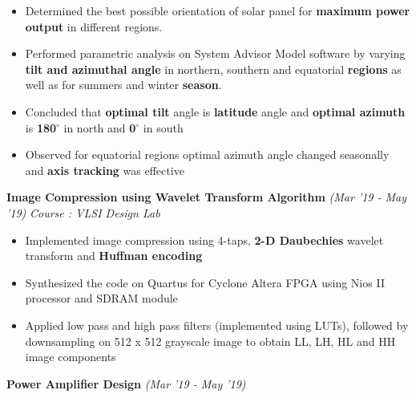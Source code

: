 \documentclass[10 pt]{article}%
\begin{document}
{{{{\vspace{-5pt}
\begin{itemize}[leftmargin=*]
	\setlength\itemsep{1.0pt}
	\setlength\parskip{1.0pt}
  \item Determined the best possible orientation of solar panel for \textbf{maximum power output} in different regions.
\item Performed parametric analysis on System Advisor Model software by varying \textbf{tilt and azimuthal angle} in northern, southern and equatorial \textbf{regions} as well as for summers and winter \textbf{season}.
\item Concluded that \textbf{optimal tilt} angle is \textbf{latitude} angle and \textbf{optimal azimuth} is \textbf{180$^{\circ}$} in north and \textbf{0$^{\circ}$}  in south
\item Observed for equatorial regions optimal azimuth angle changed seasonally and \textbf{axis tracking} was effective
\end{itemize}
\pagebreak
{\flushleft \textbf {\large{Image Compression using Wavelet Transform Algorithm}} \hfill {{{\em{(Mar '19 - May '19)}}}}
	\vspace{-0.8em}
	{\flushleft \em{Course : VLSI Design Lab}}
	\vspace{-5pt}
	\begin{itemize}[leftmargin=*]
		\setlength\itemsep{1pt}
		\setlength\parskip{1pt}
		\item Implemented image compression using 4-taps, \textbf{2-D Daubechies} wavelet transform and \textbf{Huffman encoding}
		\item Synthesized the code on Quartus for Cyclone Altera FPGA using Nios II processor and SDRAM module
	\item Applied low pass and high pass filters (implemented using LUTs), followed by downsampling on 512 x 512 grayscale image to obtain LL, LH, HL and HH image components
	\end{itemize}
{\flushleft \textbf {\large{Power Amplifier Design}} \hfill {{{\em{(Mar '19 - May '19)}}}}
}}}}}}
\end{document}

